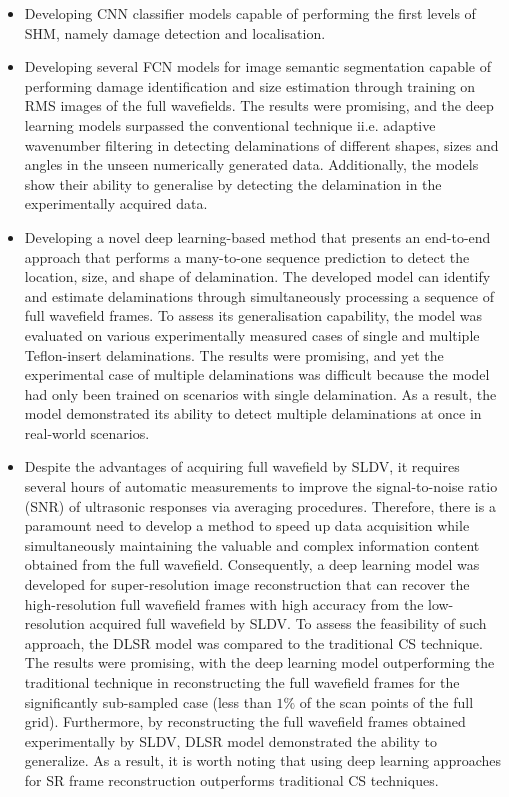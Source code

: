 \begin{itemize}
	\item Developing CNN classifier models capable of performing the first levels of SHM, namely damage detection and localisation.
	\item Developing several FCN models for image semantic segmentation capable of performing damage identification and size estimation through training on RMS images of the full wavefields.
	The results were promising, and the deep learning models surpassed the conventional technique ii.e. adaptive wavenumber filtering in detecting delaminations of different shapes, sizes and angles in the unseen numerically generated data. 
	Additionally, the models show their ability to generalise by detecting the delamination in the experimentally acquired data.
	\item Developing a novel deep learning-based method that presents an end-to-end approach that performs a many-to-one sequence prediction to detect the location, size, and shape of delamination.
	The developed model can identify and estimate delaminations through simultaneously processing a sequence of full wavefield frames.
	To assess its generalisation capability, the model was evaluated on various experimentally measured cases of single and multiple Teflon-insert delaminations.
	The results were promising, and yet the experimental case of multiple delamina\-tions was difficult because the model had only been trained on scenarios with single delamination.
	As a result, the model demonstrated its ability to detect multiple delaminations at once in real-world scenarios.
	\item Despite the advantages of acquiring full wavefield by SLDV, it requires several hours of automatic measurements to improve the signal-to-noise ratio (SNR) of ultrasonic responses via averaging procedures.
	Therefore, there is a paramount need to develop a method to speed up data acquisition while simulta\-neously maintaining the valuable and complex information content obtained from the full wavefield.
	Consequently, a deep learning model was developed for super-resolution image reconstruction that can recover the high-resolution full wavefield frames with high accuracy from the low-resolution acquired full wavefield by SLDV.
	To assess the feasibility of such approach, the DLSR model was compared to the traditional CS technique.
	The results were promising, with the deep learning model outperforming the traditional technique in reconstructing the full wavefield frames for the significantly sub-sampled case (less than $1\%$ of the scan points of the full grid).
	Furthermore, by reconstructing the full wavefield frames obtained experimentally by SLDV, DLSR model demonstrated the ability to generalize.
	As a result, it is worth noting that using deep learning approaches for SR frame reconstruction outperforms traditional CS techniques.
\end{itemize}
\clearpage
